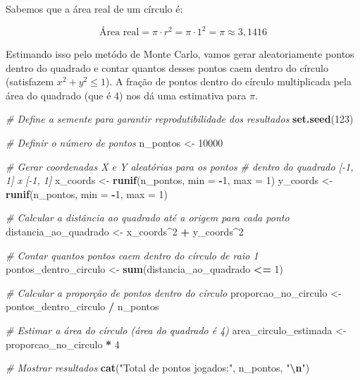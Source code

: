\documentclass[
]{book}
\newenvironment{Shaded}{\begin{snugshade}}{\end{snugshade}}
\newcommand{\AttributeTok}[1]{\textcolor[rgb]{0.13,0.29,0.53}{#1}}
\newcommand{\CommentTok}[1]{\textcolor[rgb]{0.56,0.35,0.01}{\textit{#1}}}
\newcommand{\DecValTok}[1]{\textcolor[rgb]{0.00,0.00,0.81}{#1}}
\newcommand{\FunctionTok}[1]{\textcolor[rgb]{0.13,0.29,0.53}{\textbf{#1}}}
\newcommand{\NormalTok}[1]{#1}
\newcommand{\OtherTok}[1]{\textcolor[rgb]{0.56,0.35,0.01}{#1}}
\newcommand{\SpecialCharTok}[1]{\textcolor[rgb]{0.81,0.36,0.00}{\textbf{#1}}}
\newcommand{\StringTok}[1]{\textcolor[rgb]{0.31,0.60,0.02}{#1}}
\begin{document}
Sabemos que a área real de um círculo é:

\[
\text{Área real} = \pi \cdot r^2 = \pi \cdot 1^2 = \pi \approx 3,1416
\]

Estimando isso pelo metódo de Monte Carlo, vamos gerar aleatoriamente pontos dentro do quadrado e contar quantos desses pontos caem dentro do círculo (satisfazem \(x^2 + y^2 \leq 1\)). A fração de pontos dentro do círculo multiplicada pela área do quadrado (que é 4) nos dá uma estimativa para \(\pi\).

\begin{Shaded}
\begin{Highlighting}[]
\CommentTok{\# Define a semente para garantir reprodutibilidade dos resultados}
\FunctionTok{set.seed}\NormalTok{(}\DecValTok{123}\NormalTok{)}

\CommentTok{\# Definir o número de pontos }
\NormalTok{n\_pontos }\OtherTok{\textless{}{-}} \DecValTok{10000}

\CommentTok{\# Gerar coordenadas X e Y aleatórias para os pontos }
\CommentTok{\# dentro do quadrado [{-}1, 1] x [{-}1, 1]}
\NormalTok{x\_coords }\OtherTok{\textless{}{-}} \FunctionTok{runif}\NormalTok{(n\_pontos, }\AttributeTok{min =} \SpecialCharTok{{-}}\DecValTok{1}\NormalTok{, }\AttributeTok{max =} \DecValTok{1}\NormalTok{)}
\NormalTok{y\_coords }\OtherTok{\textless{}{-}} \FunctionTok{runif}\NormalTok{(n\_pontos, }\AttributeTok{min =} \SpecialCharTok{{-}}\DecValTok{1}\NormalTok{, }\AttributeTok{max =} \DecValTok{1}\NormalTok{)}

\CommentTok{\# Calcular a distância ao quadrado até a origem para cada ponto}
\NormalTok{distancia\_ao\_quadrado }\OtherTok{\textless{}{-}}\NormalTok{ x\_coords}\SpecialCharTok{\^{}}\DecValTok{2} \SpecialCharTok{+}\NormalTok{ y\_coords}\SpecialCharTok{\^{}}\DecValTok{2}

\CommentTok{\# Contar quantos pontos caem dentro do círculo de raio 1}
\NormalTok{pontos\_dentro\_circulo }\OtherTok{\textless{}{-}} \FunctionTok{sum}\NormalTok{(distancia\_ao\_quadrado }\SpecialCharTok{\textless{}=} \DecValTok{1}\NormalTok{)}

\CommentTok{\# Calcular a proporção de pontos dentro do círculo}
\NormalTok{proporcao\_no\_circulo }\OtherTok{\textless{}{-}}\NormalTok{ pontos\_dentro\_circulo }\SpecialCharTok{/}\NormalTok{ n\_pontos}

\CommentTok{\# Estimar a área do círculo (área do quadrado é 4)}
\NormalTok{area\_circulo\_estimada }\OtherTok{\textless{}{-}}\NormalTok{ proporcao\_no\_circulo }\SpecialCharTok{*} \DecValTok{4}

\CommentTok{\# Mostrar resultados}
\FunctionTok{cat}\NormalTok{(}\StringTok{"Total de pontos jogados:"}\NormalTok{, n\_pontos, }\StringTok{"}\SpecialCharTok{\textbackslash{}n}\StringTok{"}\NormalTok{)}
\end{Highlighting}
\end{Shaded}
\end{document}
